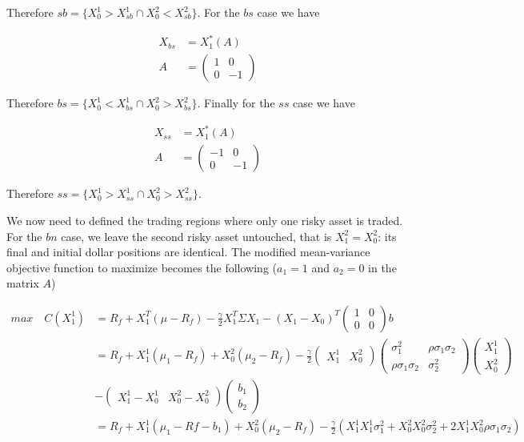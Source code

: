 \documentclass[10pt]{article}
\begin{document}
Therefore $sb = \{X_0^1 > X_{sb}^1 \cap  X_0^2 < X_{sb}^2\}$. For the $bs$ case we have 

\begin{align*}
		X_{bs} &= X_1^*(A) \\
	A &=  \begin{pmatrix}
	1 & 0\\	
	0 & -1
\end{pmatrix}
\end{align*}

Therefore $bs = \{X_0^1 < X_{bs}^1 \cap  X_0^2 > X_{bs}^2\}$. Finally for the $ss$ case we have 

\begin{align*}
		X_{ss} &= X_1^*(A) \\
	A &=  \begin{pmatrix}
	-1 & 0\\	
	0 & -1
\end{pmatrix}
\end{align*}

Therefore $ss = \{X_0^1 > X_{ss}^1 \cap  X_0^2 > X_{ss}^2\}$.

\bigbreak

We now need to defined the trading regions where only one risky asset is traded. For the $bn$ case, we leave the second risky asset untouched, that is $X_1^2 = X_0^2$: its final and initial dollar positions are identical. The modified mean-variance objective function to maximize becomes the following ($a_1 = 1$ and $a_2 = 0$ in the matrix $A$)

\begin{align*}
	max \quad C(X_1^1) &= R_f + X_1^T(\mu - R_f) - \frac{\gamma}{2}X_1^T\Sigma X_1 - (X_1 - X_0)^T \begin{pmatrix}
	1 & 0\\	
	0 & 0
\end{pmatrix} b \\
&= R_f + X_1^1(\mu_1 - R_f) + X_0^2(\mu_2 - R_f) - \frac{\gamma}{2}  \begin{pmatrix}
	X_1^1 & X_0^2
\end{pmatrix} \begin{pmatrix}
	\sigma_1^2 & \rho \sigma_1 \sigma_2\\	
	\rho \sigma_1 \sigma_2 & \sigma_2^2
\end{pmatrix} \begin{pmatrix}
	X_1^1 \\	
	X_0^2 
\end{pmatrix} \\
& - \begin{pmatrix}
	X_1^1 - X_0^1 & X_0^2 - X_0^2
\end{pmatrix} \begin{pmatrix}
	b_1 \\	
	b_2 
\end{pmatrix}\\
&= R_f + X_1^1(\mu_1 - Rf - b_1) + X_0^2(\mu_2 - R_f) - \frac{\gamma}{2}\left( X_1^1 X_1^1 \sigma_1^2 + X_0^2 X_0^2 \sigma_2^2 + 2 X_1^1X_0^2\rho \sigma_1 \sigma_2 \right)
\end{align*}
\end{document}
